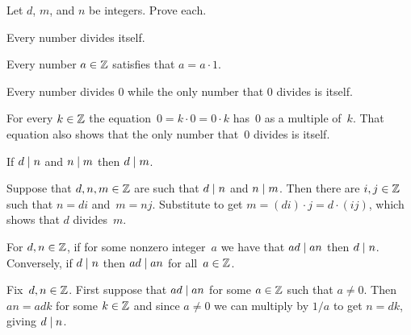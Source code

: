 \documentclass{ibl}  %
\begin{document}
\begin{problem}  
\label{ex:DivisibilityProperties}
Let $d$, $m$, and $n$ be integers.
Prove each.
\begin{exes}
\begin{exercise}
   Every number divides itself.
\end{exercise}
\begin{answer}
  Every number $a\in\mathbb{Z}$ satisfies that $a=a\cdot 1$.
\end{answer}
\begin{exercise}
  Every number divides $0$ while
  the only number that $0$ divides is itself.
\end{exercise}
\begin{answer}
  For every $k\in\mathbb{Z}$ the equation~$0=k\cdot 0=0\cdot k$ has~$0$ 
  as a multiple of~$k$.
  That equation also shows that the only number that~$0$ divides is itself. 
\end{answer}
\begin{exercise}
   If $d\mid n$ and $n\mid m$ 
   then $d\mid m$.
\end{exercise}
\begin{answer}
  Suppose that $d, n, m\in\mathbb{Z}$ are such that $d\mid n$ and
  $n\mid m$.
  Then there are $i,j\in\mathbb{Z}$ such that $n=di$ and~$m=nj$.
  Substitute to get $m=(di)\cdot j=d\cdot(ij)$, which shows that
  $d$ divides~$m$.
\end{answer}
\begin{exercise}
  For $d,n\in\mathbb{Z}$, if for some nonzero integer~$a$ we have that $ad\mid an$ 
  then $d\mid n$.
  Conversely, if $d\mid n$ then $ad\mid an$ for all~$a\in\mathbb{Z}$.
\end{exercise}
\begin{answer}
  Fix~$d,n\in\mathbb{Z}$.
  First suppose that $ad\mid an$ for some $a\in\mathbb{Z}$ such that $a\neq 0$. 
  Then $an=adk$ for some $k\in\mathbb{Z}$ and
  since $a\neq 0$ we can multiply by $1/a$ to get $n=dk$, giving 
  $d\mid n$.


\end{answer}
\end{exes}
\end{problem}
\end{document}

